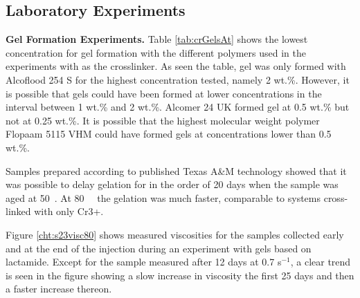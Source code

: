 \documentclass[journal = enfuem, manuscript =  article]{achemso}
\begin{document}
\subsection{Laboratory Experiments}
\textbf{Gel Formation Experiments.} Table \ref{tab:crGelsAt} shows the lowest concentration for gel formation with the different polymers used in the experiments with  as the crosslinker. As seen the table, gel was only formed with Alcoflood 254 S for the highest concentration tested, namely 2 wt.\%. However, it is possible that gels could have been formed at lower concentrations in the interval between 1 wt.\% and 2 wt.\%. Alcomer 24 UK formed gel at 0.5 wt.\% but not at 0.25 wt.\%. It is possible that the highest molecular weight polymer Flopaam 5115 VHM could have formed gels at concentrations lower than 0.5 wt.\%.

Samples prepared according to published Texas A\&M technology showed that it was possible to delay gelation for in the order of 20 days when the sample was aged at 50~\celsius. At 80~\celsius~ the gelation was much faster, comparable to systems cross-linked with only Cr3+.



Figure \ref{cht:s23visc80} shows measured viscosities for the samples collected early and at the end of the injection during an experiment with gels based on lactamide. Except for the sample measured after 12 days at 0.7 s$^{-1}$, a clear trend is seen in the figure showing a slow increase in viscosity the first 25 days and then a faster increase thereon.
\end{document}
